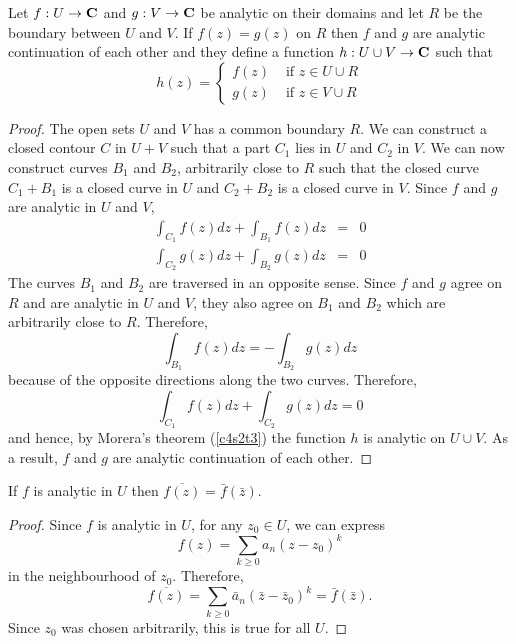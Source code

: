 \begin{prop}\label{c6s3p1}
Let $f: U \rightarrow \mathbf{C}$ and $g: V \rightarrow \mathbf{C}$ be analytic on their domains and 
let $R$ be the boundary between $U$ and $V$. If $f(z) = g(z)$ on $R$ then $f$ and $g$ are
analytic continuation of each other and they define a function $h: U \cup V \rightarrow
\mathbf{C}$ such that
\[
h(z) = \begin{cases} f(z) & \text{ if } z \in U \cup R \\
g(z) & \text{ if } z \in V \cup R
\end{cases}
\]
\end{prop}
\begin{proof}
The open sets $U$ and $V$ has a common boundary $R$. We can construct a closed contour $C$
in $U + V$ such that a part $C_1$ lies in $U$ and $C_2$ in $V$. We can now construct curves
$B_1$ and $B_2$, arbitrarily close to $R$ such that the closed curve $C_1 + B_1$ is a closed
curve in $U$ and $C_2 + B_2$ is a closed curve in $V$. Since $f$ and $g$ are analytic in
$U$ and $V$,
\begin{eqnarray*}
\int_{C_1} f(z)dz + \int_{B_1} f(z)dz &=& 0 \\
\int_{C_2} g(z)dz + \int_{B_2} g(z)dz &=& 0 
\end{eqnarray*}
The curves $B_1$ and $B_2$ are traversed in an opposite sense. Since $f$ and $g$ agree on 
$R$ and are analytic in $U$ and $V$, they also agree on $B_1$ and $B_2$ which are 
arbitrarily close to $R$. Therefore,
\[
\int_{B_1} f(z)dz = -\int_{B_2} g(z)dz
\]
because of the opposite directions along the two curves. Therefore,
\[
\int_{C_1} f(z) dz + \int_{C_2} g(z)dz = 0
\]
and hence, by Morera's theorem (\ref{c4s2t3}) the function $h$ is analytic on $U \cup V$.
As a result, $f$ and $g$ are analytic continuation of each other.
\end{proof}

\begin{prop}\label{c6s3p2}
If $f$ is analytic in $U$ then $\overline{f(z)} = \bar{f}(\bar{z})$.
\end{prop}
\begin{proof}
Since $f$ is analytic in $U$, for any $z_0 \in U$, we can express
\[
f(z) = \sum_{k \ge 0}a_n(z - z_0)^k
\]
in the neighbourhood of $z_0$. Therefore,
\[
\overline{f(z)} = \sum_{k \ge 0}\bar{a}_n(\bar{z} - \bar{z}_0)^k = \bar{f}(\bar{z}).
\]
Since $z_0$ was chosen arbitrarily, this is true for all $U$.
\end{proof}

